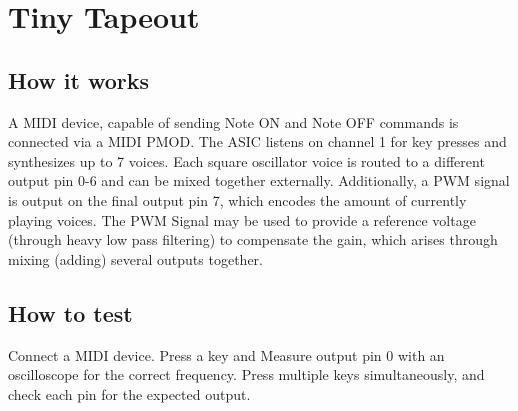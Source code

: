 \documentclass[a4paper,oneside,11pt,english]{scrartcl}
\begin{document}
\maketitle


\tableofcontents



\section{Tiny Tapeout}

\subsection{How it works}

A MIDI device, capable of sending Note ON and Note OFF commands is connected via a MIDI PMOD. The ASIC listens on channel 1 for key presses and synthesizes up to 7 voices. Each square oscillator voice is routed to a different output pin 0-6 and can be mixed together externally. Additionally, a PWM signal is output on the final output pin 7, which encodes the amount of currently playing voices. The PWM Signal may be used to provide a reference voltage (through heavy low pass filtering) to compensate the gain, which arises through mixing (adding) several outputs together.

\subsection{How to test}

Connect a MIDI device. Press a key and Measure output pin 0 with an oscilloscope for the correct frequency. Press multiple keys simultaneously, and check each pin for the expected output.
\end{document}
